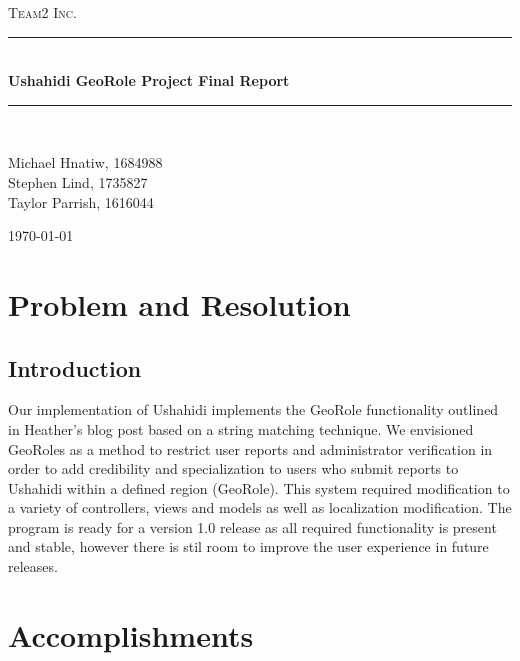 \documentclass{article}
\newcommand{\HRule}{\rule{\linewidth}{0.5mm}}
\begin{document}
\begin{titlepage}
\begin{center}
\textsc{\LARGE Team2 Inc.}\\[1.5cm]

\HRule \\[1.4cm]
{ \huge \bfseries Ushahidi GeoRole Project Final Report}\\[0.4cm]

\HRule \\[1.5cm]

\begin{minipage}{0.4\textwidth}
\begin{center}
\large Michael Hnatiw, 1684988\\
\large Stephen Lind, 1735827\\
\large Taylor Parrish, 1616044\\
\end{center}
\end{minipage}

\vfill
{\large \today}
\end{center}
\end{titlepage}

\section{Problem and Resolution}
\subsection{Introduction}
Our implementation of Ushahidi implements the GeoRole functionality outlined in Heather's blog post based on a string matching technique. We envisioned GeoRoles as a method to restrict user reports and administrator verification in order to add credibility and specialization to users who submit reports to Ushahidi within a defined region (GeoRole). This system required modification to a variety of controllers, views and models as well as localization modification. The program is ready for a version 1.0 release as all required functionality is present and stable, however there is stil room to improve the user experience in future releases.

\section{Accomplishments}
\end{document}
